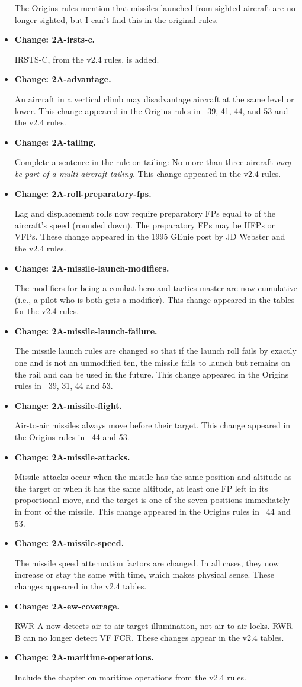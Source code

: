 \documentclass[10pt]{report}
\newcommand{\itemtag}[1]{\item \textbf{Change: #1.}\par}
\begin{document}
\begin{itemize}
    The Origins rules mention that missiles launched from sighted aircraft are no longer sighted, but I can’t find this in the original rules.
    
    \itemtag{2A-irsts-c} IRSTS-C, from the v2.4 rules, is added.

    \itemtag{2A-advantage} An aircraft in a vertical climb may disadvantage aircraft at the same level or lower. This change appeared in the Origins rules in {\APJ}~39, 41, 44, and 53 and the v2.4 rules.
    
    \itemtag{2A-tailing} Complete a sentence in the rule on tailing: No more than three aircraft \emph{may be part of a multi-aircraft tailing}. This change appeared in the v2.4 rules.

    \itemtag{2A-roll-preparatory-fps} Lag and displacement rolls now require preparatory FPs equal to {\onethird} of the aircraft's speed (rounded down). The preparatory FPs may be HFPs or VFPs. These change appeared in the 1995 GEnie post by JD Webster and the v2.4 rules.
    
    \itemtag{2A-missile-launch-modifiers} The modifiers for being a combat hero and tactics master are now cumulative (i.e., a pilot who is both gets a  modifier). This change appeared in the tables for the v2.4 rules.
    
    \itemtag{2A-missile-launch-failure} The missile launch rules are changed so that if the launch roll fails by exactly one and is not an unmodified ten, the missile fails to launch but remains on the rail and can be used in the future. This change appeared in the Origins rules in \APJ~39, 31, 44 and 53.

    \itemtag{2A-missile-flight} Air-to-air missiles always move before their target. This change appeared in the Origins rules in \APJ~44 and 53.

    \itemtag{2A-missile-attacks} Missile attacks occur when the missile has the same position and altitude as the target or when it has the same altitude, at least one FP left in its proportional move, and the target is one of the seven positions immediately in front of the missile. This change appeared in the Origins rules in \APJ~44 and 53.

    \itemtag{2A-missile-speed} The missile speed attenuation factors are changed. In all cases, they now increase or stay the same with time, which makes physical sense. These changes appeared in the v2.4 tables.

    \itemtag{2A-ew-coverage} RWR-A now detects air-to-air target illumination, not air-to-air locks. RWR-B can no longer detect VF FCR. These changes appear in the v2.4 tables.

    \itemtag{2A-maritime-operations} Include the chapter on maritime operations from the v2.4 rules.
    
\end{itemize}
\end{document}
